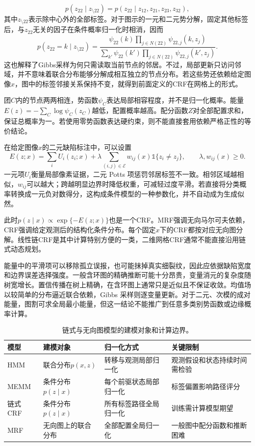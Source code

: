 \begin{equation}
 p(z_{22}\mid z_{\setminus 22})
 =p(z_{22}\mid z_{12},z_{21},z_{23},z_{32}),
\end{equation}
其中$z_{\setminus 22}$表示除中心外的全部标签。对于图示的一元和二元势分解，固定其他标签后，与$z_{22}$无关的因子在条件概率归一化时相消，因而
\begin{equation}
 p(z_{22}=k\mid z_{\setminus 22})
 =\frac{\psi_{22}(k)\prod_{j\in N(22)}\psi_{22,j}(k,z_j)}
 {\sum_{k'}\psi_{22}(k')\prod_{j\in N(22)}\psi_{22,j}(k',z_j)}.
\end{equation}
这也解释了Gibbs采样为何只需读取当前节点的邻居。不过，局部更新只访问邻域，并不意味着联合分布能够分解成相互独立的节点分布。若这些势还依赖给定图像$x$，图中的标签邻接关系保持不变，就得到前面定义的CRF在网格上的形式。

团$C$内的节点两两相连，势函数$\psi_C$表达局部相容程度，并不是归一化概率。能量$E(z)=-\sum_C\log\psi_C(z_C)$越低，配置概率越高。配分函数$Z$对全部配置求和，保证总概率为一。若使用零势函数表达硬约束，则不能直接套用依赖严格正性的等价结论。

在给定图像$x$的二元缺陷标注中，可以设置
\begin{equation}
 E(z;x)=\sum_i U_i(z_i;x)+\lambda\sum_{(i,j)\in\mathcal E}
 w_{ij}(x)\mathbb 1\{z_i\ne z_j\},\qquad \lambda,w_{ij}(x)\geq0.
\end{equation}
一元项$U_i$衡量局部像素证据，二元 Potts 项惩罚邻居标签不一致。相邻区域越相似，$w_{ij}$可以越大；跨越明显边界时降低权重，可减轻过度平滑。若直接将分类概率转换成一元负对数得分，这构成条件模型的一种参数化，并不自动成为生成似然。

此时$p(z\mid x)\propto\exp\{-E(z;x)\}$也是一个CRF。MRF强调无向马尔可夫依赖，CRF强调给定观测后的结构化条件分布。每个固定$x$下的CRF都按对应无向图分解。线性链CRF是其中计算特别方便的一类，二维网格CRF通常不能直接沿用链式动态规划。

能量中的平滑项可以移除孤立误报，也可能抹掉真实细裂纹，因此应依据缺陷宽度和边界误差选择强度。一般含环图的精确推断可能十分昂贵，变量消元的复杂度随树宽增长。置信传播在树上精确，在含环图上通常只是近似且不保证收敛。均值场以较简单的分布逼近联合依赖，Gibbs 采样则逐变量更新。对于二元、次模的成对能量，图割可求全局最小能量，但这一结论不能推广到任意多类别势函数或边缘概率计算。

\begin{table}[htbp]
\centering
\caption{链式与无向图模型的建模对象和计算边界。}
\label{tab:bayes-graph-models}
\small
\begin{tabular}{p{1.3cm}p{3.1cm}p{3.3cm}p{4.2cm}}
\hline
模型 & 建模对象 & 归一化方式 & 关键限制 \\
\hline
HMM & 联合分布$p(x,z)$ & 转移与观测局部归一化 & 观测假设和状态持续时间需检验 \\
MEMM & 条件分布$p(z\mid x)$ & 每个前驱状态局部归一化 & 标签偏置影响路径评分 \\
链式 CRF & 条件分布$p(z\mid x)$ & 所有标签路径全局归一化 & 训练需计算模型期望 \\
MRF & 无向图上的联合分布 & 全部配置全局归一化 & 一般图中配分函数和推断困难 \\
\hline
\end{tabular}
\end{table}

